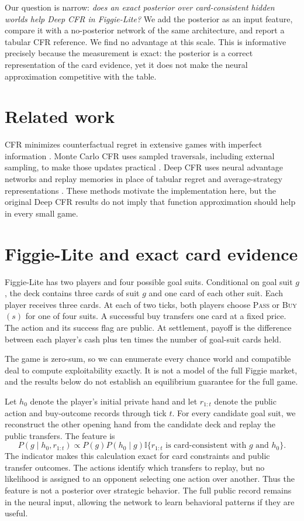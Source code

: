 Our question is narrow: \emph{does an exact posterior over card-consistent hidden worlds help Deep CFR in Figgie-Lite?} We add the posterior as an input feature, compare it with a no-posterior network of the same architecture, and report a tabular CFR reference. We find no advantage at this scale. This is informative precisely because the measurement is exact: the posterior is a correct representation of the card evidence, yet it does not make the neural approximation competitive with the table.

\section{Related work}

CFR minimizes counterfactual regret in extensive games with imperfect information \citep{zinkevich2007regret}. Monte Carlo CFR uses sampled traversals, including external sampling, to make those updates practical \citep{lanctot2009mccfr}. Deep CFR uses neural advantage networks and replay memories in place of tabular regret and average-strategy representations \citep{brown2019deepcfr}. These methods motivate the implementation here, but the original Deep CFR results do not imply that function approximation should help in every small game.

\section{Figgie-Lite and exact card evidence}

Figgie-Lite has two players and four possible goal suits. Conditional on goal suit $g$, the deck contains three cards of suit $g$ and one card of each other suit. Each player receives three cards. At each of two ticks, both players choose \textsc{Pass} or \textsc{Buy}$(s)$ for one of four suits. A successful buy transfers one card at a fixed price. The action and its success flag are public. At settlement, payoff is the difference between each player's cash plus ten times the number of goal-suit cards held.

The game is zero-sum, so we can enumerate every chance world and compatible deal to compute exploitability exactly. It is not a model of the full Figgie market, and the results below do not establish an equilibrium guarantee for the full game.

Let $h_0$ denote the player's initial private hand and let $r_{1:t}$ denote the public action and buy-outcome records through tick $t$. For every candidate goal suit, we reconstruct the other opening hand from the candidate deck and replay the public transfers. The feature is
\[
P(g \mid h_0, r_{1:t}) \propto
P(g)P(h_0 \mid g)
\mathbb{I}\{\text{$r_{1:t}$ is card-consistent with $g$ and $h_0$}\}.
\]
The indicator makes this calculation exact for card constraints and public transfer outcomes. The actions identify which transfers to replay, but no likelihood is assigned to an opponent selecting one action over another. Thus the feature is not a posterior over strategic behavior. The full public record remains in the neural input, allowing the network to learn behavioral patterns if they are useful.

